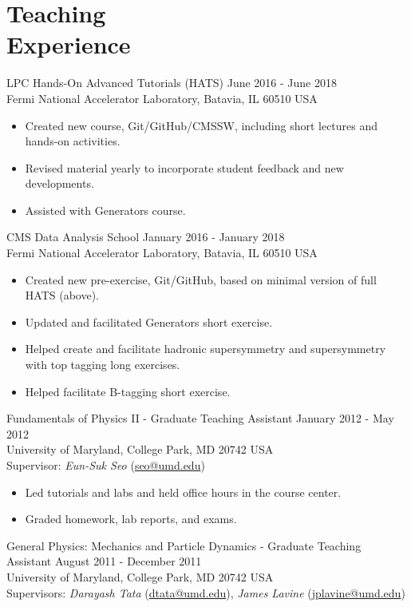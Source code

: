 \section{Teaching\\Experience}
LPC Hands-On Advanced Tutorials (HATS) \hfill June 2016 - June 2018\\
Fermi National Accelerator Laboratory, Batavia, IL 60510 USA
\begin{itemize}[leftmargin=12pt]
\item Created new course, Git/GitHub/CMSSW, including short lectures and hands-on activities.
\item Revised material yearly to incorporate student feedback and new developments.
\item Assisted with Generators course.
\end{itemize}
CMS Data Analysis School \hfill January 2016 - January 2018\\
Fermi National Accelerator Laboratory, Batavia, IL 60510 USA
\begin{itemize}[leftmargin=12pt]
\item Created new pre-exercise, Git/GitHub, based on minimal version of full HATS (above).
\item Updated and facilitated Generators short exercise.
\item Helped create and facilitate hadronic supersymmetry and supersymmetry with top tagging long exercises.
\item Helped facilitate B-tagging short exercise.
\end{itemize}
Fundamentals of Physics II - Graduate Teaching Assistant \hfill January 2012 - May 2012\\
University of Maryland, College Park, MD 20742 USA\\
Supervisor: {\sl Eun-Suk Seo} (\href{mailto:seo@umd.edu}{seo@umd.edu})
\begin{itemize}[leftmargin=12pt]
\item Led tutorials and labs and held office hours in the course center.
\item Graded homework, lab reports, and exams.
\end{itemize}
General Physics: Mechanics and Particle Dynamics - Graduate Teaching Assistant \hfill August 2011 - December 2011\\
University of Maryland, College Park, MD 20742 USA\\
Supervisors: {\sl Darayash Tata} (\href{mailto:dtata@umd.edu}{dtata@umd.edu}), {\sl James Lavine} (\href{mailto:jplavine@umd.edu}{jplavine@umd.edu})
